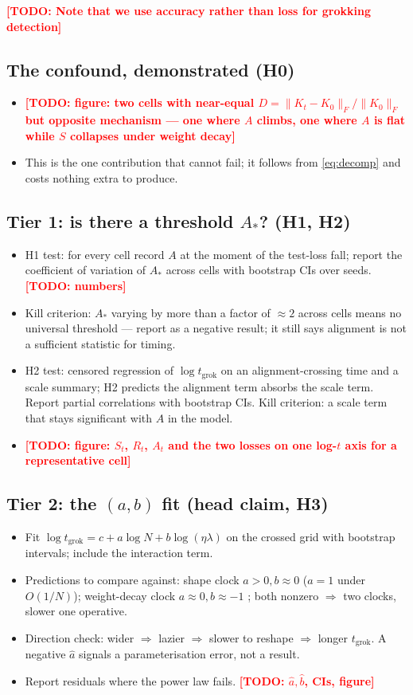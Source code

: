\documentclass[a4paper,11pt]{article} %
\newcommand{\TODO}[1]{\textcolor{red}{\textbf{[TODO: #1]}}}
\newcommand{\Fnorm}[1]{\lVert #1 \rVert_F}
\newcommand{\tgrok}{t_{\mathrm{grok}}}
\newcommand{\Astar}{A_{*}}
\begin{document}
\TODO{Note that we use accuracy rather than loss for grokking detection}

\subsection{The confound, demonstrated (H0)}
\begin{itemize}
	\item \TODO{figure: two cells with near-equal $D=\Fnorm{K_t-K_0}/\Fnorm{K_0}$
		but opposite mechanism --- one where $A$ climbs, one where $A$ is flat while
		$S$ collapses under weight decay}
	\item This is the one contribution that cannot fail; it follows from
		\eqref{eq:decomp} and costs nothing extra to produce.
\end{itemize}

\subsection{Tier 1: is there a threshold $\Astar$? (H1, H2)}
\begin{itemize}
	\item H1 test: for every cell record $A$ at the moment of the test-loss fall;
		report the coefficient of variation of $\Astar$ across cells with bootstrap
		CIs over seeds. \TODO{numbers}
	\item Kill criterion: $\Astar$ varying by more than a factor of $\approx2$
		across cells means no universal threshold --- report as a negative result;
		it still says alignment is not a sufficient statistic for timing.
	\item H2 test: censored regression of $\log\tgrok$ on an alignment-crossing
		time and a scale summary; H2 predicts the alignment term absorbs the scale
		term. Report partial correlations with bootstrap CIs. Kill criterion: a
		scale term that stays significant with $A$ in the model.
	\item \TODO{figure: $S_t$, $R_t$, $A_t$ and the two losses on one log-$t$ axis
		for a representative cell}
\end{itemize}

\subsection{Tier 2: the $(a,b)$ fit (head claim, H3)}
\begin{itemize}
	\item Fit $\log\tgrok=c+a\log N+b\log(\eta\lambda)$ on the crossed grid with
		bootstrap intervals; include the interaction term.
	\item Predictions to compare against: shape clock $a>0,b\approx0$
		($a=1$ under $O(1/N)$); weight-decay clock $a\approx0,b\approx-1$
		\citep{kim2026clock}; both nonzero $\Rightarrow$ two clocks, slower one
		operative.
	\item Direction check: wider $\Rightarrow$ lazier $\Rightarrow$ slower to
		reshape $\Rightarrow$ longer $\tgrok$. A negative $\hat a$ signals a
		parameterisation error, not a result.
	\item Report residuals where the power law fails. \TODO{$\hat a,\hat b$, CIs,
		figure}
\end{itemize}
\end{document}
